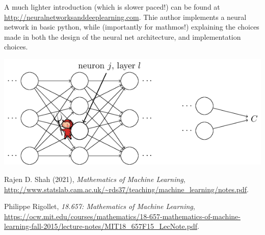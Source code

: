 \documentclass[11pt]{scrartcl}
\begin{document}
\begin{remark}
A much lighter introduction (which is slower paced!) can be found at \url{http://neuralnetworksanddeeplearning.com}. Thie author implements a neural network in basic python, while (importantly for mathmos!) explaining the choices made in both the design of the neural net architecture, and implementation choices.

\begin{center}
\includegraphics[scale=0.5]{demon2.png}
    \label{fig:demon}
\end{center}

\end{remark}

\begin{thebibliography}{9}
Rajen D. Shah (2021), \emph{Mathematics of Machine Learning}, \url{http://www.statslab.cam.ac.uk/~rds37/teaching/machine_learning/notes.pdf}.

Philippe Rigollet, \emph{18.657: Mathematics of Machine Learning}, \url{https://ocw.mit.edu/courses/mathematics/18-657-mathematics-of-machine-learning-fall-2015/lecture-notes/MIT18_657F15_LecNote.pdf}.

\end{thebibliography}
\end{document}
